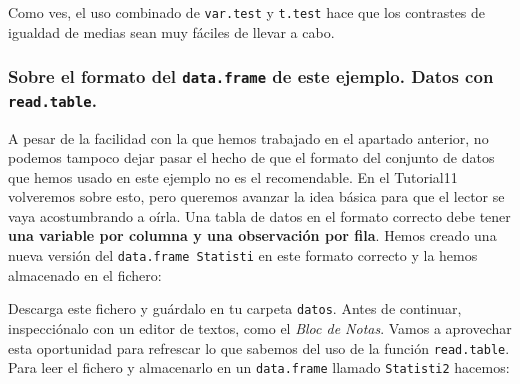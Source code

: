 \documentclass[10pt,a4paper]{article}\usepackage[]{graphicx}\usepackage[]{color}
\makeatletter
\newenvironment{kframe}{%
 \def\at@end@of@kframe{}%
 \ifinner\ifhmode%
  \def\at@end@of@kframe{\end{minipage}}%
  \begin{minipage}{\columnwidth}%
 \fi\fi%
 \def\FrameCommand##1{\hskip\@totalleftmargin \hskip-\fboxsep
 \colorbox{shadecolor}{##1}\hskip-\fboxsep
     \hskip-\linewidth \hskip-\@totalleftmargin \hskip\columnwidth}%
 \MakeFramed {\advance\hsize-\width
   \@totalleftmargin\z@ \linewidth\hsize
   \@setminipage}}%
 {\par\unskip\endMakeFramed%
 \at@end@of@kframe}
\newenvironment{knitrout}{}{} %
\newcounter {cont01}
\makeatother
\begin{document}
Como ves, el uso combinado de {\tt var.test} y {\tt t.test} hace que los contrastes de igualdad de medias sean muy fáciles de llevar a cabo.

\subsubsection*{Sobre el formato del {\tt data.frame} de este ejemplo. Datos con {\tt read.table}.}

\begin{knitrout}
\color{fgcolor}\begin{kframe}


{\ttfamily\noindent\bfseries\color{errorcolor}{\#\# Error in eval(expr, envir, enclos): objeto 'Statisti' no encontrado}}

{\ttfamily\noindent\bfseries\color{errorcolor}{\#\# Error in eval(expr, envir, enclos): objeto 'Statisti' no encontrado}}

{\ttfamily\noindent\bfseries\color{errorcolor}{\#\# Error in data.frame(scores = scores, group = group): objeto 'scores' no encontrado}}

{\ttfamily\noindent\bfseries\color{errorcolor}{\#\# Error in is.data.frame(x): objeto 'statisti2' no encontrado}}\end{kframe}
\end{knitrout}


A pesar de la facilidad con la que hemos trabajado en el apartado anterior, no podemos tampoco dejar pasar el hecho de que el formato del conjunto de datos que hemos usado en este ejemplo no es el recomendable. En el Tutorial11 volveremos sobre esto, pero queremos avanzar la idea básica para que el lector se vaya acostumbrando a oírla. Una tabla de datos en el formato correcto debe tener {\bf una variable por columna y una observación por fila}.
Hemos creado una nueva versión del {\tt data.frame Statisti} en  este formato correcto y la hemos almacenado en el fichero:
\begin{center}
\end{center}
Descarga este fichero y guárdalo en tu carpeta {\tt datos}. Antes de continuar, inspecciónalo con un editor de textos, como el {\em Bloc de Notas}. Vamos a aprovechar esta oportunidad para refrescar lo que sabemos del uso de la función {\tt read.table}. Para leer el fichero y almacenarlo en un {\tt data.frame} llamado {\tt Statisti2} hacemos:
\end{document}
